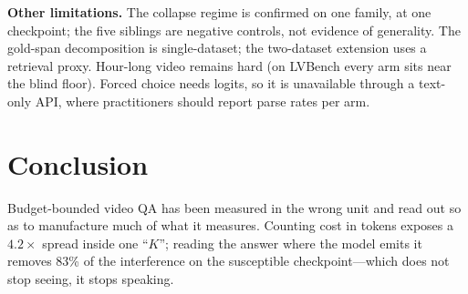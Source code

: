 \documentclass[10pt,twocolumn,letterpaper]{article}
\begin{document}
\noindent\textbf{Other limitations.} The collapse regime is confirmed on one family, at one checkpoint; the five siblings are negative controls, not evidence of generality. The gold-span decomposition is single-dataset; the two-dataset extension uses a retrieval proxy. Hour-long video remains hard (on LVBench every arm sits near the blind floor). Forced choice needs logits, so it is unavailable through a text-only API, where practitioners should report parse rates per arm.

\section{Conclusion}
\label{sec:conclusion}

Budget-bounded video QA has been measured in the wrong unit and read out so as to manufacture much of what it measures. Counting cost in tokens exposes a $4.2\times$ spread inside one ``$K$''; reading the answer where the model emits it removes 83\% of the interference on the susceptible checkpoint---which does not stop seeing, it stops speaking.

{\small


}
\end{document}
